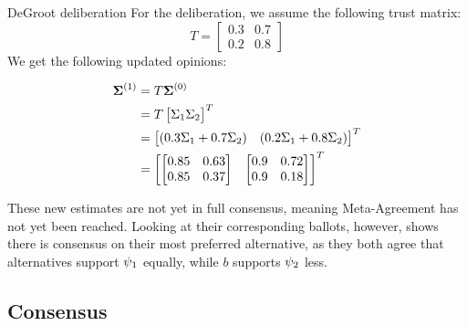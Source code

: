 \begin{example}{DeGroot deliberation} {}
	For the deliberation, we assume the following trust matrix:
	\[
		T= \begin{bmatrix}
			0.3 & 0.7 \\
			0.2 & 0.8
		\end{bmatrix}
	\]
	We get the following updated opinions:

	\begin{align*}
		\boldsymbol{\boldsymbol{\Sigma}}^{(1)}
		 & =
		T\boldsymbol{\boldsymbol{\Sigma}}^{(0)}
		\\ &
		=T\begin{bmatrix}\Sigma_1
			  \Sigma_2\end{bmatrix}^{T}
		\\ &
		=\begin{bmatrix}(0.3\Sigma_1
			 + 0.7\Sigma_{2}) &
			 (0.2\Sigma_1 +
			 0.8\Sigma_{2})\end{bmatrix}^{T} \\
		 & = \begin{bmatrix}
			     \begin{bmatrix}
				0.85 & 0.63
				\\
				0.85 & 0.37\end{bmatrix}
			      &
			     \begin{bmatrix}
				0.9 & 0.72
				\\ 0.9 & 0.18 \\
			\end{bmatrix}
		     \end{bmatrix}^{T}
	\end{align*}

	These new estimates are not yet in full consensus, meaning Meta-Agreement has not yet been reached.  Looking at their
	corresponding ballots, however, shows there is consensus on their most preferred alternative,
	as they both agree that alternatives support $\psi_1$ equally, while $b$
	supports $\psi_2$ less.

	\label{example:deGroot-delib}
\end{example}


\subsection{Consensus} \label{sub: concensus DeGroot}


